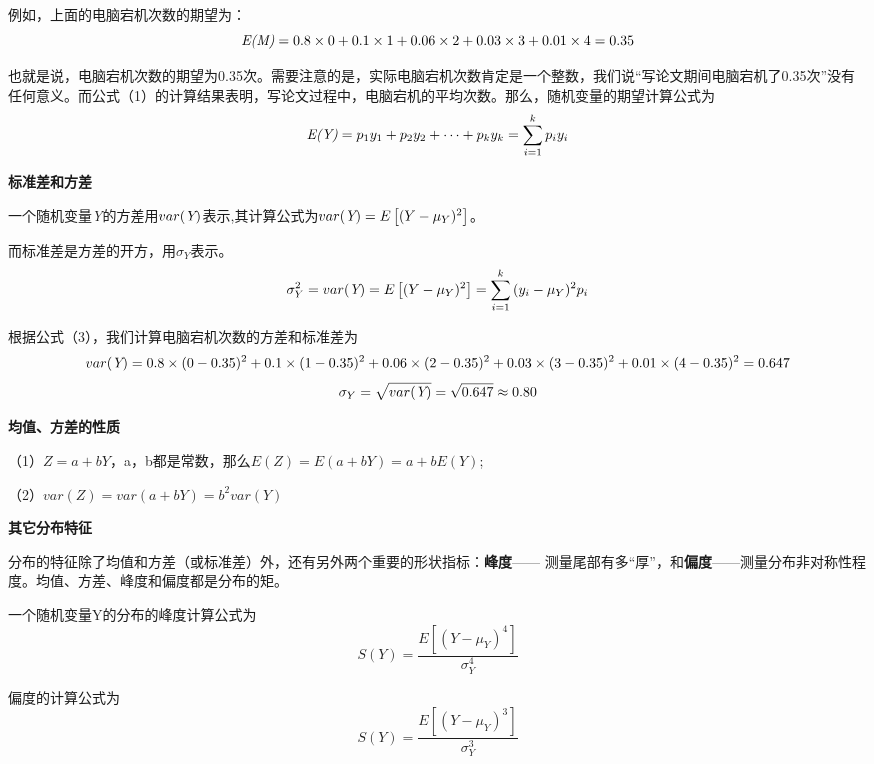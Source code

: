 \documentclass[cn,12pt,math=newtx,citestyle=gb7714-2015,bibstyle=gb7714-2015]{elegantbook}
\begin{document}
	例如，上面的电脑宕机次数的期望为：
	\begin{equation}
		\emph{E(M)}=0.8\times0+0.1\times1+0.06\times2+0.03\times3+0.01\times4=0.35
	\end{equation}
	
	也就是说，电脑宕机次数的期望为0.35次。需要注意的是，实际电脑宕机次数肯定是一个整数，我们说“写论文期间电脑宕机了0.35次”没有任何意义。而公式（1）的计算结果表明，写论文过程中，电脑宕机的平均次数。那么，随机变量的期望计算公式为
	\begin{equation}
		\emph{E(Y)}=p_1y_1+p_2y_2+\cdots+p_ky_k=\sum_{i=1}^{k}{p_iy_i}
	\end{equation}
	
	\textbf{标准差和方差}
	
	一个随机变量\emph{Y}的方差用$var(\emph{Y})$表示,其计算公式为$var(\emph{Y})=E\left[(Y-\mu_{Y})^2\right]$。
	
	而标准差是方差的开方，用$\sigma_{Y}$表示。
	\begin{equation}
		\sigma_{Y}^2=var(\emph{Y})=E\left[(Y-\mu_{Y})^2\right]=\sum_{i=1}^{k}{(y_i-\mu_{Y})^2p_i}
	\end{equation}
	
	根据公式（3），我们计算电脑宕机次数的方差和标准差为
	\begin{equation}
		var(\emph{Y})=0.8\times(0-0.35)^2+0.1\times(1-0.35)^2+0.06\times(2-0.35)^2+0.03\times(3-0.35)^2+0.01\times(4-0.35)^2=0.647
	\end{equation}
	\begin{equation}
		\sigma_{Y}=\sqrt{var(\emph{Y})}=\sqrt{0.647}\approx0.80
	\end{equation}
	
	\textbf{均值、方差的性质}
	
	（1）$Z=a+bY$，a，b都是常数，那么$E(Z)=E(a+bY)=a+bE(Y)$;
	
	（2）$var(Z)=var(a+bY)=b^2var(Y)$
	
	\textbf{其它分布特征}
	
	分布的特征除了均值和方差（或标准差）外，还有另外两个重要的形状指标：\textbf{峰度}—— 测量尾部有多“厚”，和\textbf{偏度}——测量分布非对称性程度。均值、方差、峰度和偏度都是分布的矩。
	
	一个随机变量Y的分布的峰度计算公式为
	\begin{equation}
		S(Y)=\frac{E\left[(Y-\mu_{Y})^4\right]}{\sigma_{Y}^4}
	\end{equation}
	
	偏度的计算公式为
	\begin{equation}
		S(Y)=\frac{E\left[(Y-\mu_{Y})^3\right]}{\sigma_{Y}^3}
	\end{equation}
	
\end{document}
